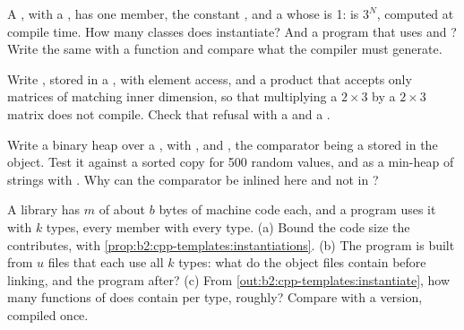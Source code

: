 \begin{exercise}[$\star\star$]\label{exo:b2:cpp-templates:8}
A  , with a  , has one member, the constant
, and a   whose
 is 1:  is $3^N$, computed at compile time. How many classes does
 instantiate? And a program that uses  and ? Write the same with a
 function and compare what the compiler must generate.
\end{exercise}

\begin{exercise}[$\star\star$]\label{exo:b2:cpp-templates:9}
Write , stored in a , with element access,  and a
product  that accepts only matrices of matching inner dimension, so that multiplying a $2 \times 3$
by a $2 \times 3$ matrix does not compile. Check that refusal with a  and a .
\end{exercise}

\begin{exercise}[$\star\star\star$]\label{exo:b2:cpp-templates:10}
Write a binary heap  over a , with ,  and
, the comparator being a  stored in the object. Test it against a sorted copy for 500
random values, and as a min-heap of strings with . Why can the comparator be inlined here and not
in ?
\end{exercise}

\begin{exercise}[$\star\star\star$]\label{exo:b2:cpp-templates:11}
A library  has $m$  of about $b$ bytes of machine code each, and a program uses it with $k$
types, every member with every type. (a) Bound the code size the  contributes, with
\cref{prop:b2:cpp-templates:instantiations}. (b) The program is built from $u$ files that each use all $k$ types:
what do the object files contain before linking, and the program after? (c) From
\cref{out:b2:cpp-templates:instantiate}, how many functions of  does  contain per type,
roughly? Compare with a  version, compiled once.
\end{exercise}

